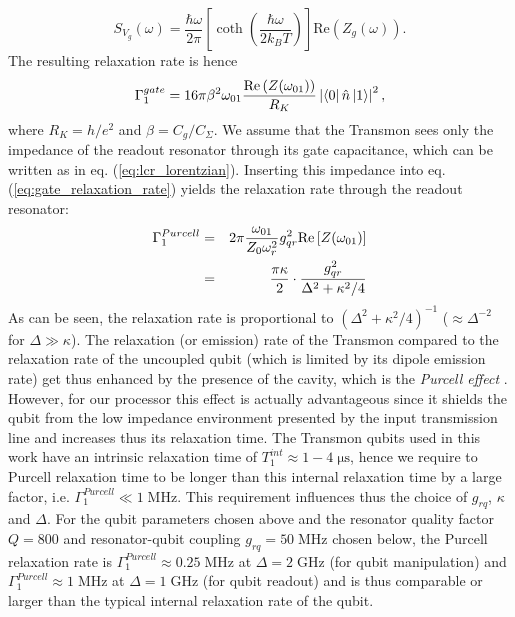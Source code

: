 %
\begin{equation}
S_{V_g}(\omega) = \frac{\hbar\omega}{2\pi}\left[\coth{\left(\frac{\hbar \omega}{2 k_B T}\right)}\right]\mathrm{Re}\left(Z_g(\omega)\right).
\end{equation}
%
The resulting relaxation rate is hence
%
\begin{equation}
\Gamma_1^{gate} = 16\pi\beta^2 \omega_{01} \frac{\mathrm{Re}\left(Z(\omega_{01})\right)}{R_K}\left|\left< 0 \right|\hat{n}\left| 1 \right>\right|^2, \label{eq:gate_relaxation_rate}
\end{equation}
%
where $R_K = h/e^2$ and $\beta=C_g/C_\Sigma$. We assume that the Transmon sees only the impedance of the readout resonator through its gate capacitance, which can be written as in eq. (\ref{eq:lcr_lorentzian}). Inserting this impedance into eq. (\ref{eq:gate_relaxation_rate}) yields the relaxation rate through the readout resonator:
%
\begin{eqnarray}
\Gamma_1^{Purcell} & = & 2\pi\frac{\omega_{01}}{Z_0 \omega_r^2}g_{qr}^2 \mathrm{Re}\left[Z(\omega_{01})\right] \notag \\
                & = & \frac{\pi\kappa}{2}\cdot\frac{g_{qr}^2}{\Delta^2+\kappa^2/4} \label{eq:purcell_rate}
\end{eqnarray}
%
As can be seen, the relaxation rate is proportional to $(\Delta^2+\kappa^2/4)^{-1}$ ($\approx\Delta^{-2}$ for $\Delta \gg \kappa$). The relaxation (or emission) rate of the Transmon compared to the relaxation rate of the uncoupled qubit (which is limited by its dipole emission rate) get thus enhanced by the presence of the cavity, which is the {\it Purcell effect} \citep{purcell_spontaneous_1946}. However, for our processor this effect is actually advantageous since it shields the qubit from the low impedance environment presented by the input transmission line and increases thus its relaxation time. The Transmon qubits used in this work have an intrinsic relaxation time of $T_1^{int}\approx 1-4 \; \mathrm{\mu s}$, hence we require to Purcell relaxation time to be longer than this internal relaxation time by a large factor, i.e. $\Gamma_1^{Purcell}\ll 1\;\mathrm{MHz}$. This requirement influences thus the choice of $g_{rq}$, $\kappa$ and $\Delta$. For the qubit parameters chosen above and the resonator quality factor $Q=800$ and resonator-qubit coupling $g_{rq}=50\;\mathrm{MHz}$ chosen below, the Purcell relaxation rate is $\Gamma_1^{Purcell}\approx 0.25\;\mathrm{MHz}$ at $\Delta = 2\;\mathrm{GHz}$ (for qubit manipulation) and $\Gamma_1^{Purcell}\approx 1\;\mathrm{MHz}$ at $\Delta = 1\;\mathrm{GHz}$ (for qubit readout) and is thus comparable or larger than the typical internal relaxation rate of the qubit.
 

